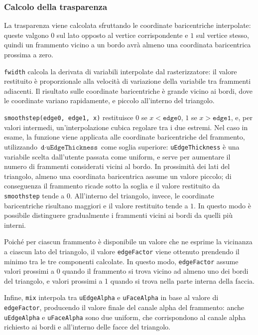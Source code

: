 

\subsubsection{Calcolo della trasparenza}
La trasparenza viene calcolata sfruttando le coordinate baricentriche
interpolate: queste valgono $0$ sul lato opposto al vertice corrispondente e $1$ sul vertice stesso, quindi un frammento vicino a un bordo avrà almeno una coordinata baricentrica prossima a zero.

\texttt{fwidth} calcola la derivata di variabili interpolate dal rasterizzatore: il valore restituito è proporzionale alla velocità di variazione della variabile tra frammenti adiacenti.
Il risultato sulle coordinate baricentriche è grande vicino ai bordi, dove le coordinate variano rapidamente, e piccolo all'interno del triangolo.

\texttt{smoothstep(edge0, edge1, x)} restituisce $0$ se $x < \texttt{edge0}$, $1$ se $x > \texttt{edge1}$, e, per valori intermedi, un'interpolazione cubica regolare tra i due estremi.
Nel caso in esame, la funzione viene applicata alle coordinate baricentriche del frammento, utilizzando $\texttt{d} \cdot \texttt{uEdgeThickness}$ come soglia superiore: \texttt{uEdgeThickness} è una variabile scelta dall'utente passata come uniform, e serve per aumentare il numero di frammenti considerati vicini al bordo.
In prossimità dei lati del triangolo, almeno una coordinata baricentrica assume un valore piccolo; di conseguenza il frammento ricade sotto la soglia e il valore restituito da \texttt{smoothstep} tende a $0$.
All'interno del triangolo, invece, le coordinate baricentriche risultano maggiori e il valore restituito tende a $1$. In questo modo è possibile distinguere gradualmente i frammenti vicini ai bordi da quelli più interni.

Poiché per ciascun frammento è disponibile un valore che ne esprime la vicinanza a ciascun lato del triangolo, il valore \texttt{edgeFactor} viene ottenuto prendendo il minimo tra le tre componenti calcolate.
In questo modo, \texttt{edgeFactor} assume valori prossimi a $0$ quando il frammento si trova vicino ad almeno uno dei bordi del triangolo, e valori prossimi a 1 quando si trova nella parte interna della faccia.

Infine, \texttt{mix} interpola tra \texttt{uEdgeAlpha} e \texttt{uFaceAlpha} in base al valore di \texttt{edge\allowbreak{}Factor}, producendo il valore finale del canale alpha del frammento: anche \texttt{uEdgeAlpha} e \texttt{uFaceAlpha} sono due uniform, che corrispondono al canale alpha richiesto ai bordi e all'interno delle facce del triangolo.

